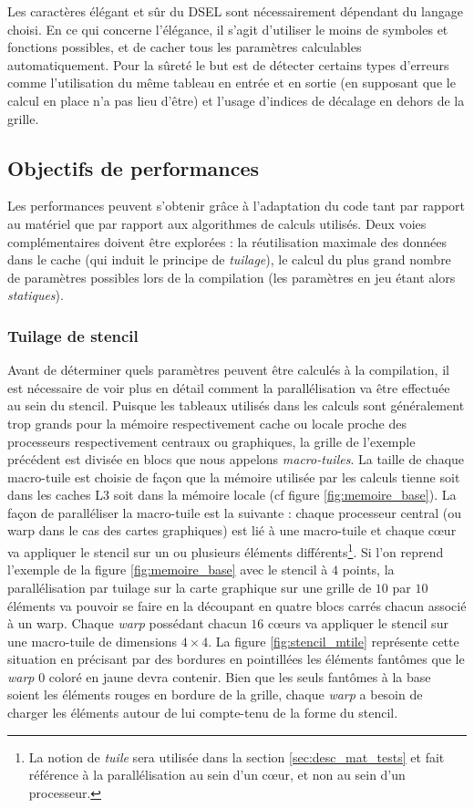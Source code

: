 Les caractères élégant et sûr du DSEL sont nécessairement dépendant du langage choisi. En ce qui concerne l'élégance, il s'agit d'utiliser le moins de symboles et fonctions possibles, et de cacher tous les paramètres calculables automatiquement. Pour la sûreté le but est de détecter certains types d'erreurs comme l'utilisation du même tableau en entrée et en sortie (en supposant que le calcul en place n'a pas lieu d'être) et l'usage d'indices de décalage en dehors de la grille.

\subsection{Objectifs de performances}
\label{sec:obj_perf}

Les performances peuvent s'obtenir grâce à l'adaptation du code tant par rapport au matériel que par rapport aux algorithmes de calculs utilisés. Deux voies complémentaires doivent être explorées : la réutilisation maximale des données dans le cache (qui induit le principe de \emph{tuilage}), le calcul du plus grand nombre de paramètres possibles lors de la compilation (les paramètres en jeu étant alors \emph{statiques}).

\subsubsection*{Tuilage de stencil} 

Avant de déterminer quels paramètres peuvent être calculés à la compilation, il est nécessaire de voir plus en détail comment la parallélisation va être effectuée au sein du stencil. Puisque les tableaux utilisés dans les calculs sont généralement trop grands pour la mémoire respectivement cache ou locale proche des processeurs respectivement centraux ou graphiques, la grille de l'exemple précédent est divisée en blocs que nous appelons \emph{macro-tuiles}. La taille de chaque macro-tuile est choisie de façon que la mémoire utilisée par les calculs tienne soit dans les caches L3 soit dans la mémoire locale (cf figure \ref{fig:memoire_base}). La façon de paralléliser la macro-tuile est la suivante : chaque processeur central (ou warp dans le cas des cartes graphiques) est lié à une macro-tuile et chaque cœur va appliquer le stencil sur un ou plusieurs éléments différents\footnote{La notion de \emph{tuile} sera utilisée dans la section \ref{sec:desc_mat_tests} et fait référence à la parallélisation au sein d'un cœur, et non au sein d'un processeur.}. Si l'on reprend l'exemple de la figure \ref{fig:memoire_base} avec le stencil à $4$ points, la parallélisation par tuilage sur la carte graphique sur une grille de $10$ par $10$ éléments va pouvoir se faire en la découpant en quatre blocs carrés chacun associé à un warp. Chaque \emph{warp} possédant chacun $16$ cœurs va appliquer le stencil sur une macro-tuile de dimensions $4 \times 4$. La figure \ref{fig:stencil_mtile} représente cette situation en précisant par des bordures en pointillées les éléments fantômes que le \emph{warp} $0$ coloré en jaune devra contenir. Bien que les seuls fantômes à la base soient les éléments rouges en bordure de la grille, chaque \emph{warp} a besoin de charger les éléments autour de lui compte-tenu de la forme du stencil.

